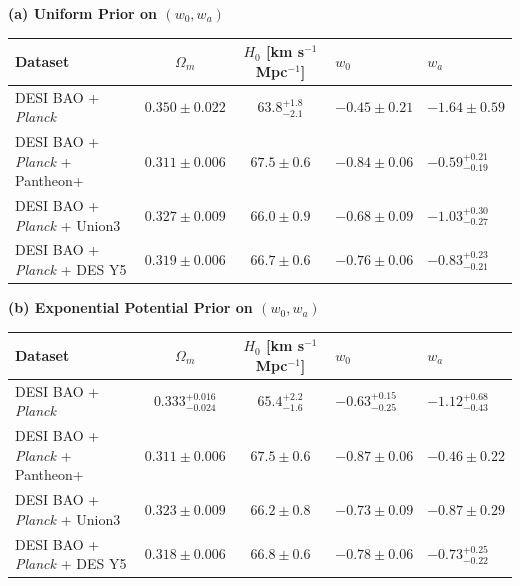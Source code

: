 \begin{table}[!t]
	\centering
	\footnotesize
	\textbf{(a) Uniform Prior on $(w_0,w_a)$}\\[6pt]
		\begingroup
		\renewcommand{\arraystretch}{1}
		\begin{tabularx}{\textwidth}{@{}>{\raggedright\arraybackslash}p{3.5cm} c c W W @{}}
			\toprule
			Dataset & $\Omega_m$ & $H_0$ [km s$^{-1}$ Mpc$^{-1}$] & $w_0$ & $w_a$ \\
			\midrule[0.065em]
			DESI BAO + {\it Planck}  & $0.350\pm 0.022$ & $63.8^{+1.8}_{-2.1}$ & $-0.45\pm 0.21$ & $-1.64\pm 0.59$ \\
			DESI BAO + {\it Planck}  + Pantheon+ & $0.311\pm 0.006$ & $67.5\pm 0.6$ & $-0.84\pm 0.06$ & $-0.59^{+0.21}_{-0.19}$\\
			DESI BAO + {\it Planck}  + Union3 & $0.327\pm 0.009$ & $66.0\pm 0.9$ & $-0.68\pm 0.09$ & $-1.03^{+0.30}_{-0.27}$\\
			DESI BAO + {\it Planck}  + DES Y5 & $0.319\pm 0.006$ & $66.7\pm 0.6$ & $-0.76\pm 0.06$ & $-0.83^{+0.23}_{-0.21}$\\
			\bottomrule
		\end{tabularx}
		\endgroup
	\vspace{10pt}
    
	\textbf{(b) Exponential Potential Prior on $(w_0,w_a)$}\\[6pt]
		\begingroup
		\renewcommand{\arraystretch}{1}
		\begin{tabularx}{\textwidth}{@{}>{\raggedright\arraybackslash}p{3.5cm} c c W W @{}}
			\toprule
			Dataset & $\Omega_m$ & $H_0$ [km s$^{-1}$ Mpc$^{-1}$] & $w_0$ & $w_a$ \\
			\midrule[0.065em]
			DESI BAO + {\it Planck}  & $0.333^{+0.016}_{-0.024}$ & $65.4^{+2.2}_{-1.6}$ & $-0.63^{+0.15}_{-0.25}$ & $-1.12^{+0.68}_{-0.43}$\\
			DESI BAO + {\it Planck}  + Pantheon+ & $0.311\pm 0.006$ & $67.5\pm 0.6$ & $-0.87\pm 0.06$ & $-0.46\pm 0.22$ \\
			DESI BAO + {\it Planck}  + Union3 & $0.323\pm 0.009$ & $66.2\pm 0.8$ & $-0.73\pm 0.09$ & $-0.87\pm 0.29$\\
			DESI BAO + {\it Planck}  + DES Y5 & $0.318\pm 0.006$ & $66.8\pm 0.6$ & $-0.78\pm 0.06$ & $-0.73^{+0.25}_{-0.22}$\\
			\bottomrule
		\end{tabularx}
		\endgroup
	\vspace{10pt}
    

\end{table}
